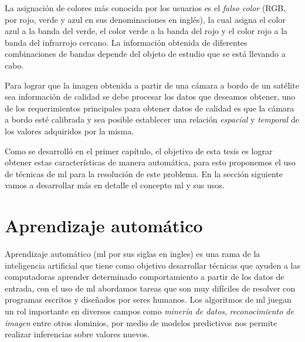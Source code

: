 La asignación de colores más conocida por los usuarios es el \textit{falso color} (RGB, por rojo, verde y azul en sus denominaciones en inglés), la cual asigna el color azul a la banda del verde, el color verde a la banda del rojo y el color rojo a la banda del infrarrojo cercano. La información obtenida de diferentes combinaciones de bandas depende del objeto de estudio que se está llevando a cabo.


Para lograr que la imagen obtenida a partir de una cámara a bordo de un satélite sea información de calidad se debe procesar los datos que deseamos obtener, uno de los requerimientos principales para obtener datos de calidad es que la cámara a bordo esté calibrada y sea posible establecer una relación \textit{espacial} y \textit{temporal} de los valores adquiridos por la misma.

Como se desarrolló en el primer capítulo, el objetivo de esta tesis es lograr obtener estas características de manera automática, para esto proponemos el uso de técnicas de \ac{ml} para la resolución de este problema. En la sección siguiente vamos a desarrollar más en detalle  el concepto \ac{ml} y sus usos.




\section{Aprendizaje automático}\label{sec:machinelaerning}

Aprendizaje automático (\ac{ml} por sus siglas en ingles) es una rama de la inteligencia artificial que tiene como objetivo desarrollar técnicas que ayuden a las computadoras aprender determinado comportamiento a partir de los datos de entrada, con el uso de \ac{ml} abordamos tareas que son muy difíciles de resolver con programas escritos y diseñados por seres humanos. Los algoritmos de \ac{ml} juegan un rol importante en diversos campos como \textit{minería de datos}, \textit{reconocimiento de imagen} entre otros dominios, por medio de modelos predictivos nos permite realizar inferencias sobre valores nuevos. 

